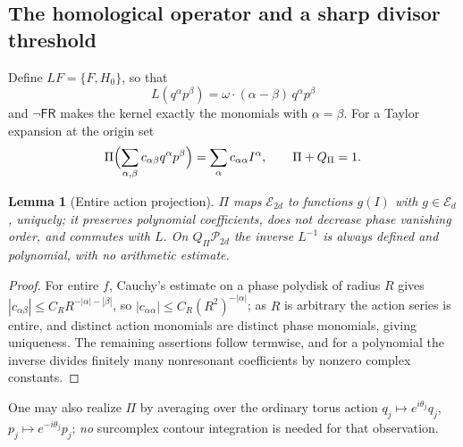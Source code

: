 \documentclass[11pt,letterpaper]{article}
\newtheorem{lemma}[lemma]{Lemma}
\theoremstyle{definition}
\theoremstyle{remark}
\newcommand{\EE}{\mathscr E}
\newcommand{\PP}{\mathscr P}
\newcommand{\fres}{\mathsf{FR}}
\numberwithin{equation}{section}
\begin{document}
\subsection{The homological operator and a sharp divisor threshold}
Define $LF=\{F,H_0\}$, so that
\begin{equation}\label{dyn:eq:hamhomological}
 L(q^{\alpha}p^{\beta})=\omega\cdot(\alpha-\beta)\,q^{\alpha}p^{\beta}
\end{equation}
and $\lnot\fres$ makes the kernel exactly the monomials with
$\alpha=\beta$. For a Taylor expansion at the origin set
\begin{equation}\label{dyn:eq:projection}
 \Pi\Bigl(\sum_{\alpha,\beta}c_{\alpha\beta}q^{\alpha}p^{\beta}\Bigr)
 =\sum_\alpha c_{\alpha\alpha}I^{\alpha},\qquad \Pi+Q_\Pi=1 .
\end{equation}

\begin{lemma}[Entire action projection]\label{dyn:lem:projection}
$\Pi$ maps $\EE_{2d}$ to functions $g(I)$ with $g\in\EE_d$, uniquely; it
preserves polynomial coefficients, does not decrease phase vanishing order,
and commutes with $L$. On $Q_\Pi\PP_{2d}$ the inverse $L^{-1}$ is
\emph{always} defined and polynomial, with no arithmetic estimate.
\end{lemma}
\begin{proof}
For entire $f$, Cauchy's estimate on a phase polydisk of radius $R$ gives
$|c_{\alpha\beta}|\le C_RR^{-|\alpha|-|\beta|}$, so
$|c_{\alpha\alpha}|\le C_R(R^{2})^{-|\alpha|}$; as $R$ is arbitrary the
action series is entire, and distinct action monomials are distinct phase
monomials, giving uniqueness. The remaining assertions follow termwise, and
for a polynomial the inverse divides finitely many nonresonant coefficients
by nonzero complex constants.
\end{proof}

One may also realize $\Pi$ by averaging over the ordinary torus action
$q_j\mapsto e^{i\theta_j}q_j$, $p_j\mapsto e^{-i\theta_j}p_j$; \emph{no}
surcomplex contour integration is needed for that observation.
\end{document}
